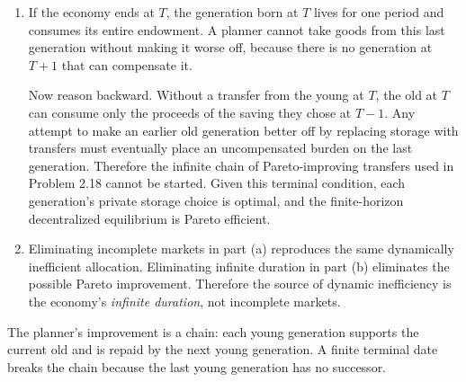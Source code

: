 \begin{solution}
\begin{enumerate}[label=(\alph*)]
\begin{enumerate}[label=(\roman*)]
        If \(Q_{t+1}>Q_t/x\), then storage dominates market trade. The
        coefficient on \(S_t\) in \eqref{eq:p220-lifetime-budget} is
        positive, so the young choose the upper bound \(S_t=A\). To consume
        while young they must be net demanders of the date-\(t\) good, but
        the old have no matching supply. In either case the date-\(t\)
        goods market cannot clear. Thus the only equilibrium price sequence
        satisfies \(Q_{t+1}=Q_t/x\) at every date.
    \end{enumerate}

    \item If the economy ends at \(T\), the generation born at \(T\) lives
    for one period and consumes its entire endowment. A planner cannot take
    goods from this last generation without making it worse off, because
    there is no generation at \(T+1\) that can compensate it.

    Now reason backward. Without a transfer from the young at \(T\), the
    old at \(T\) can consume only the proceeds of the saving they chose at
    \(T-1\). Any attempt to make an earlier old generation better off by
    replacing storage with transfers must eventually place an uncompensated
    burden on the last generation. Therefore the infinite chain of
    Pareto-improving transfers used in Problem 2.18 cannot be started.
    Given this terminal condition, each generation's private storage choice
    is optimal, and the finite-horizon decentralized equilibrium is Pareto
    efficient.

    \item Eliminating incomplete markets in part (a) reproduces the same
    dynamically inefficient allocation. Eliminating infinite duration in
    part (b) eliminates the possible Pareto improvement. Therefore the
    source of dynamic inefficiency is the economy's \emph{infinite
    duration}, not incomplete markets.
\end{enumerate}
\end{solution}

\begin{note}
    The planner's improvement is a chain: each young generation supports
    the current old and is repaid by the next young generation. A finite
    terminal date breaks the chain because the last young generation has no
    successor.
\end{note}

